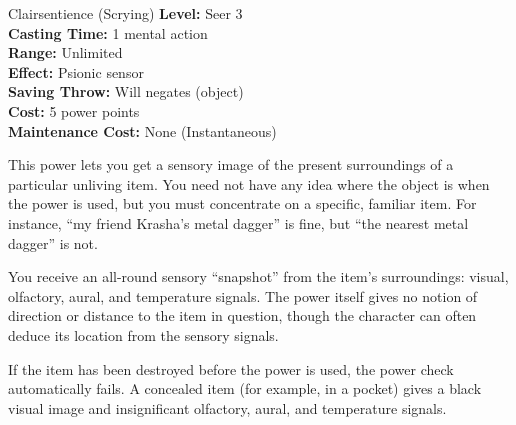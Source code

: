{Clairsentience (Scrying)}
{
	\textbf{Level:}
	Seer 3\\
	\textbf{Casting Time:}
	1 mental action\\
	\textbf{Range:}
	Unlimited\\
	\textbf{Effect:}
	Psionic sensor\\
	\textbf{Saving Throw:}
	Will negates (object)\\
	\textbf{Cost:}
	5 power points\\
	\textbf{Maintenance Cost:}
	None (Instantaneous)\\
}
{
	This power lets you get a sensory image of the present surroundings of a particular unliving item. You need not have any idea where the object is when the power is used, but you must concentrate on a specific, familiar item. For instance, ``my friend Krasha's metal dagger'' is fine, but ``the nearest metal dagger'' is not.

	You receive an all-round sensory ``snapshot'' from the item's surroundings: visual, olfactory, aural, and temperature signals. The power itself gives no notion of direction or distance to the item in question, though the character can often deduce its location from the sensory signals.

	If the item has been destroyed before the power is used, the power check automatically fails. A concealed item (for example, in a pocket) gives a black visual image and insignificant olfactory, aural, and temperature signals.
}